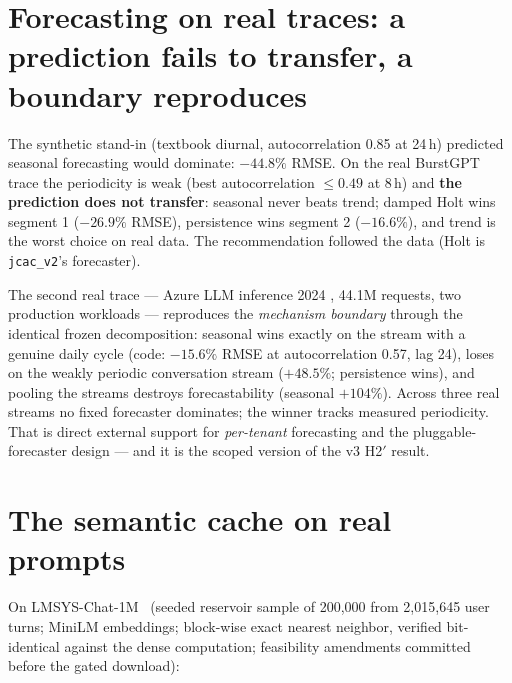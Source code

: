 \section{Forecasting on real traces: a prediction fails to transfer, a
boundary reproduces}
\label{sec:eval-forecast}

The synthetic stand-in (textbook diurnal, autocorrelation 0.85 at 24\,h)
predicted seasonal forecasting would dominate: $-44.8\%$ RMSE. On the real
BurstGPT trace the periodicity is weak (best autocorrelation $\le 0.49$ at
8\,h) and \textbf{the prediction does not transfer}: seasonal never beats
trend; damped Holt wins segment 1 ($-26.9\%$ RMSE), persistence wins segment
2 ($-16.6\%$), and trend is the worst choice on real data. The
recommendation followed the data (Holt is \texttt{jcac\_v2}'s forecaster).

The second real trace --- Azure LLM inference 2024
\citep{azurellmtrace2024}, 44.1M requests, two production workloads ---
reproduces the \emph{mechanism boundary} through the identical frozen
decomposition: seasonal wins exactly on the stream with a genuine daily
cycle (code: $-15.6\%$ RMSE at autocorrelation 0.57, lag 24), loses on the
weakly periodic conversation stream ($+48.5\%$; persistence wins), and
pooling the streams destroys forecastability (seasonal $+104\%$). Across
three real streams no fixed forecaster dominates; the winner tracks measured
periodicity. That is direct external support for \emph{per-tenant}
forecasting and the pluggable-forecaster design --- and it is the scoped
version of the v3 H2$'$ result.

\section{The semantic cache on real prompts}
\label{sec:eval-cache}

On LMSYS-Chat-1M~\citep{lmsyschat1m2024} (seeded reservoir sample of
200{,}000 from 2{,}015{,}645 user turns; MiniLM embeddings; block-wise exact
nearest neighbor, verified bit-identical against the dense computation;
feasibility amendments committed before the gated download):

